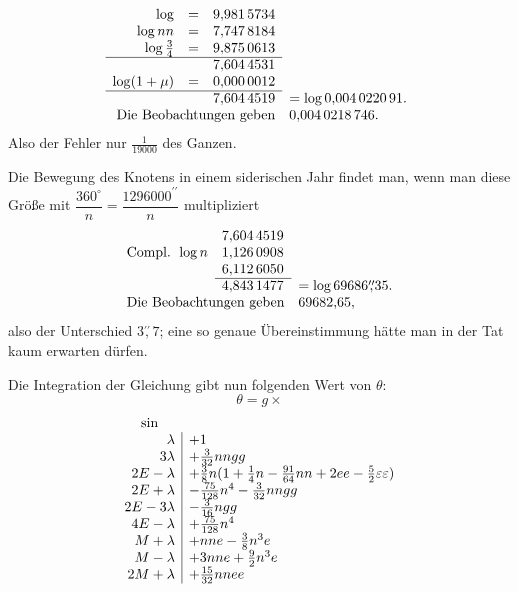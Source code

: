 \begingroup\small
\setlength{\arraycolsep}{2pt}
\renewcommand{\arraystretch}{1.15}
\[
\begin{array}{rcll}
\log&=&9{,}981\,5734&\\
\log nn&=&7{,}747\,8184&\\
\log\tfrac34&=&9{,}875\,0613&\\
\cline{1-3}
&&7{,}604\,4531&\\
\log(1+\mu)&=&0{,}000\,0012&\\
\cline{1-3}
&&7{,}604\,4519&=\log0{,}004\,0220\,91.\\
\multicolumn{3}{r}{\text{Die Beobachtungen geben}}&0{,}004\,0218\,746.
\end{array}
\]
\endgroup
\noindent Also der Fehler nur \(\tfrac1{19000}\) des Ganzen.
\par\noindent\hspace*{\parindent}Die Bewegung des Knotens in einem siderischen Jahr findet man, wenn
man diese Größe mit \(\dfrac{360^\circ}{n}=\dfrac{1296000^{\prime\prime}}{n}\) multipliziert
\begingroup\small
\setlength{\arraycolsep}{2pt}
\renewcommand{\arraystretch}{1.15}
\[
\begin{array}{rll}
&7{,}604\,4519&\\
\text{Compl. }\log n&1{,}126\,0908&\\
&6{,}112\,6050&\\
\cline{2-2}
&4{,}843\,1477&=\log69686\overset{\prime\prime}{,}35.\\
\multicolumn{2}{r}{\text{Die Beobachtungen geben}}&69682{,}65,
\end{array}
\]
\endgroup
\noindent also der Unterschied \(3\overset{\prime\prime}{,}7\); eine so genaue Übereinstimmung hätte man in der
Tat kaum erwarten dürfen.
\par\noindent\hspace*{\parindent}Die Integration der Gleichung gibt nun folgenden Wert von \(\theta\):
\[
\theta=g\times
\]
\begingroup\small
\setlength{\arraycolsep}{4pt}
\renewcommand{\arraystretch}{1.3}
\[
\begin{array}{r|l}
\multicolumn{1}{c}{\sin}&\\
\lambda&+1\\
3\lambda&+\tfrac3{32}nngg\\
2E-\lambda&+\tfrac38n(1+\tfrac14n-\tfrac{91}{64}nn+2ee-\tfrac52\varepsilon\varepsilon)\\
2E+\lambda&-\tfrac{75}{128}n^4-\tfrac3{32}nngg\\
2E-3\lambda&-\tfrac3{16}ngg\\
4E-\lambda&+\tfrac{75}{128}n^4\\
M+\lambda&+nne-\tfrac38n^3e\\
M-\lambda&+3nne+\tfrac92n^3e\\
2M+\lambda&+\tfrac{15}{32}nnee
\end{array}
\]
